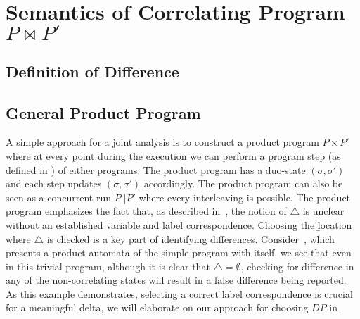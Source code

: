 \section{Semantics of Correlating Program $P \bowtie P'$} 

\subsection{Definition of Difference} 


\subsection{General Product Program} 
A simple approach for a joint analysis is to construct a product program $P \times P'$ where at every point during the execution we can perform a program step (as defined in ) of either programs. The product program has a duo-state $(\sigma,\sigma')$ and each step updates $(\sigma,\sigma')$ accordingly. The product program can also be seen as a concurrent run $P||P'$ where every interleaving is possible. The product program emphasizes the fact that, as described in~, the notion of $\triangle$ is unclear without an established variable and label correspondence. Choosing the \b{location} where $\triangle$ is checked is a key part of identifying differences. Consider~, which presents a product automata of the simple program with itself, we see that even in this trivial program, although it is clear that $\triangle = \emptyset$, checking for difference in any of the non-correlating states will result in a false difference being reported. As this example demonstrates, selecting a correct label correspondence is crucial for a meaningful delta, we will elaborate on our approach for choosing $DP$ in .

